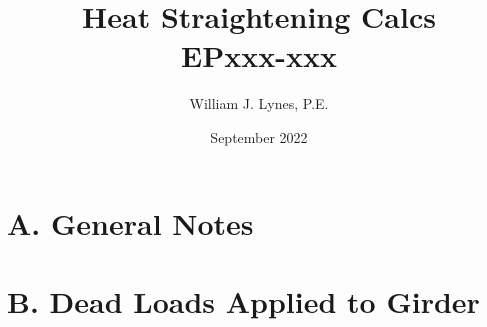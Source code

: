 \documentclass[11pt,letterpaper]{article}
\author{William J. Lynes, P.E.}
\title{Heat Straightening Calcs\\EPxxx-xxx}
\date{September 2022}
\begin{document}
 

\setcounter{page}{1}
\tableofcontents

\newpage

\newcommand\zzz[1]{%
\clearpage
\vspace*{\fill}
{\centering\fontfamily{cmss}\selectfont\fontsize{24pt}{24pt}\bfseries#1\par}
\vspace*{\fill}
\clearpage}
\titleformat{\section}{\zzz}{\thesection}{1em}{}


\newcommand\yyy[1]{%
\clearpage
\vspace*{\fill}
{\centering\fontfamily{cmss}\selectfont\fontsize{18pt}{18pt}\bfseries#1\par}
\vspace*{\fill}
\clearpage}
\titleformat{\subsection}{\yyy}{\thesection}{1em}{}

\newcommand\aaa[1]{%
\clearpage
\vspace*{\fill}
{\centering\fontfamily{cmss}\selectfont\fontsize{14pt}{14pt}\bfseries#1\par}
\vspace*{\fill}
\clearpage}
\titleformat{\subsubsection}{\aaa}{\thesection}{1em}{}

\setcounter{page}{1}
\renewcommand{\thepage}{A.\arabic{page}}
\section{A. General Notes}
 

\setcounter{page}{1}
\renewcommand{\thepage}{B.\arabic{page}}
\section{B. Dead Loads Applied to Girder}
 

\setcounter{page}{1}
\renewcommand{\thepage}{C.\arabic{page}}
\end{document}
